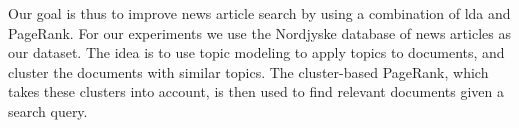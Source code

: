 Our goal is thus to improve news article search by using a combination of \gls{lda} and PageRank.
For our experiments we use the Nordjyske database of news articles as our dataset.
The idea is to use topic modeling to apply topics to documents, and cluster the documents with similar topics.
The cluster-based PageRank, which takes these clusters into account, is then used to find relevant documents given a search query.




